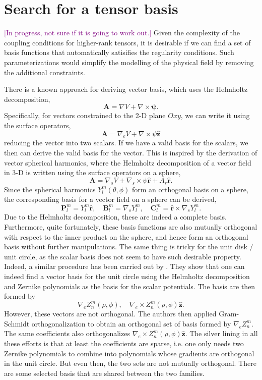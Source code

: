 \documentclass[a4paper, 11pt]{article}
\newcommand{\todoitem}[1]{\textcolor{purple}{[#1]}}
\begin{document}
\section{Search for a tensor basis}

\todoitem{In progress, not sure if it is going to work out.}
Given the complexity of the coupling conditions for higher-rank tensors, it is desirable if we can find a set of basis functions that automatically satisifies the regularity conditions. Such parameterizations would simplify the modelling of the physical field by removing the additional constraints.

There is a known approach for deriving vector basis, which uses the Helmholtz decomposition,
\begin{equation}
    \mathbf{A} = \nabla V + \nabla \times \bm{\psi}.
\end{equation}
Specifically, for vectors constrained to the 2-D plane $Oxy$, we can write it using the surface operators,
\begin{equation}
    \mathbf{A} = \nabla_e V + \nabla \times \psi \hat{\mathbf{z}}
\end{equation}
reducing the vector into two scalars. If we have a valid basis for the scalars, we then can derive the valid basis for the vector. This is inspired by the derivation of vector spherical harmonics, where the Helmholtz decomposition of a vector field in 3-D is written using the surface operators on a sphere,
\[
    \mathbf{A} = \nabla_s V + \nabla_s \times \psi \hat{\mathbf{r}} + A_r \hat{\mathbf{r}}.
\]
Since the spherical harmonics $Y_l^m(\theta, \phi)$ form an orthogonal basis on a sphere, the corresponding basis for a vector field on a sphere can be derived,
\[
    \mathbf{P}_l^m = Y_l^m \hat{\mathbf{r}},\quad \mathbf{B}_l^m = \nabla_s Y_l^m,\quad \mathbf{C}_l^m = \hat{\mathbf{r}} \times \nabla_s Y_l^m.
\]
Due to the Helmholtz decomposition, these are indeed a complete basis. Furthermore, quite fortunately, these basis functions are also mutually orthogonal with respect to the inner product on the sphere, and hence form an orthogonal basis without further manipulations. The same thing is tricky for the unit disk / unit circle, as the scalar basis does not seem to have such desirable property. Indeed, a similar procedure has been carried out by \textcite{zhao_orthonormal_2007, zhao_orthonormal_2008}. They show that one can indeed find a vector basis for the unit circle using the Helmholtz decomposition and Zernike polynomials as the basis for the scalar potentials. The basis are then formed by
\[
    \nabla_e Z_n^m (\rho, \phi),\quad \nabla_e \times Z_n^m(\rho, \phi) \hat{\mathbf{z}}.
\]
However, these vectors are not orthogonal. The authors then applied Gram-Schmidt orthogonalization to obtain an orthogonal set of basis formed by $\nabla_e Z_n^m$. The same coefficients also orthogonalizes $\nabla_e \times Z_n^m(\rho,\phi) \hat{\mathbf{z}}$. The silver lining in all these efforts is that at least the coefficients are sparse, i.e. one only needs two Zernike polynomials to combine into polynomials whose gradients are orthogonal in the unit circle. But even then, the two sets are not mutually orthogonal. There are some selected basis that are shared between the two families.
\end{document}
